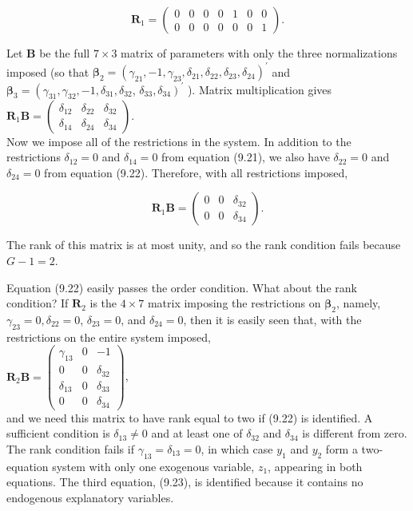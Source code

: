 \documentclass[10pt]{article}
\begin{document}
$$
\mathbf{R}_{1}=\left(\begin{array}{lllllll}
0 & 0 & 0 & 0 & 1 & 0 & 0 \\
0 & 0 & 0 & 0 & 0 & 0 & 1
\end{array}\right) .
$$

Let $\mathbf{B}$ be the full $7 \times 3$ matrix of parameters with only the three normalizations imposed (so that $\boldsymbol{\beta}_{2}=\left(\gamma_{21},-1, \gamma_{23}, \delta_{21}, \delta_{22}, \delta_{23}, \delta_{24}\right)^{\prime}$ and $\boldsymbol{\beta}_{3}=\left(\gamma_{31}, \gamma_{32},-1, \delta_{31}, \delta_{32}\right.$, $\left.\delta_{33}, \delta_{34}\right)^{\prime}$ ). Matrix multiplication gives\\
$\mathbf{R}_{1} \mathbf{B}=\left(\begin{array}{lll}\delta_{12} & \delta_{22} & \delta_{32} \\ \delta_{14} & \delta_{24} & \delta_{34}\end{array}\right)$.\\
Now we impose all of the restrictions in the system. In addition to the restrictions $\delta_{12}=0$ and $\delta_{14}=0$ from equation (9.21), we also have $\delta_{22}=0$ and $\delta_{24}=0$ from equation (9.22). Therefore, with all restrictions imposed,

\[
\mathbf{R}_{1} \mathbf{B}=\left(\begin{array}{ccc}
0 & 0 & \delta_{32}  \tag{9.24}\\
0 & 0 & \delta_{34}
\end{array}\right) .
\]

The rank of this matrix is at most unity, and so the rank condition fails because $G-1=2$.

Equation (9.22) easily passes the order condition. What about the rank condition? If $\mathbf{R}_{2}$ is the $4 \times 7$ matrix imposing the restrictions on $\boldsymbol{\beta}_{2}$, namely, $\gamma_{23}=0, \delta_{22}=0$, $\delta_{23}=0$, and $\delta_{24}=0$, then it is easily seen that, with the restrictions on the entire system imposed,\\
$\mathbf{R}_{2} \mathbf{B}=\left(\begin{array}{ccc}\gamma_{13} & 0 & -1 \\ 0 & 0 & \delta_{32} \\ \delta_{13} & 0 & \delta_{33} \\ 0 & 0 & \delta_{34}\end{array}\right)$,\\
and we need this matrix to have rank equal to two if (9.22) is identified. A sufficient condition is $\delta_{13} \neq 0$ and at least one of $\delta_{32}$ and $\delta_{34}$ is different from zero. The rank condition fails if $\gamma_{13}=\delta_{13}=0$, in which case $y_{1}$ and $y_{2}$ form a two-equation system with only one exogenous variable, $z_{1}$, appearing in both equations. The third equation, (9.23), is identified because it contains no endogenous explanatory variables.
\end{document}
